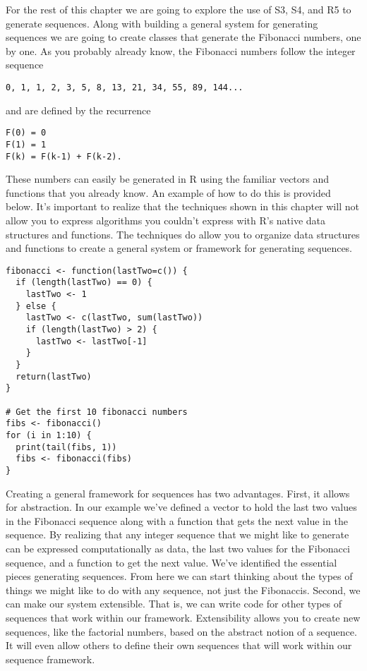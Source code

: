 For the rest of this chapter we are going to explore the use of S3, S4,
and R5 to generate sequences. Along with building a general system for
generating sequences we are going to create classes that generate the
Fibonacci numbers, one by one. As you probably already know, the
Fibonacci numbers follow the integer sequence

\begin{verbatim}
0, 1, 1, 2, 3, 5, 8, 13, 21, 34, 55, 89, 144...
\end{verbatim}

and are defined by the recurrence

\begin{verbatim}
F(0) = 0
F(1) = 1
F(k) = F(k-1) + F(k-2). 
\end{verbatim}

These numbers can easily be generated in R using the familiar vectors
and functions that you already know. An example of how to do this is
provided below. It's important to realize that the techniques shown in
this chapter will not allow you to express algorithms you couldn't
express with R's native data structures and functions. The techniques do
allow you to organize data structures and functions to create a general
system or framework for generating sequences.

\begin{verbatim}
fibonacci <- function(lastTwo=c()) {
  if (length(lastTwo) == 0) {
    lastTwo <- 1
  } else {
    lastTwo <- c(lastTwo, sum(lastTwo))
    if (length(lastTwo) > 2) {
      lastTwo <- lastTwo[-1]
    }
  }
  return(lastTwo)
}

# Get the first 10 fibonacci numbers
fibs <- fibonacci()
for (i in 1:10) {
  print(tail(fibs, 1))
  fibs <- fibonacci(fibs)
}
\end{verbatim}

Creating a general framework for sequences has two advantages. First, it
allows for abstraction. In our example we've defined a vector to hold
the last two values in the Fibonacci sequence along with a function that
gets the next value in the sequence. By realizing that any integer
sequence that we might like to generate can be expressed computationally
as data, the last two values for the Fibonacci sequence, and a function
to get the next value. We've identified the essential pieces generating
sequences. From here we can start thinking about the types of things we
might like to do with any sequence, not just the Fibonaccis. Second, we
can make our system extensible. That is, we can write code for other
types of sequences that work within our framework. Extensibility allows
you to create new sequences, like the factorial numbers, based on the
abstract notion of a sequence. It will even allow others to define their
own sequences that will work within our sequence framework.

